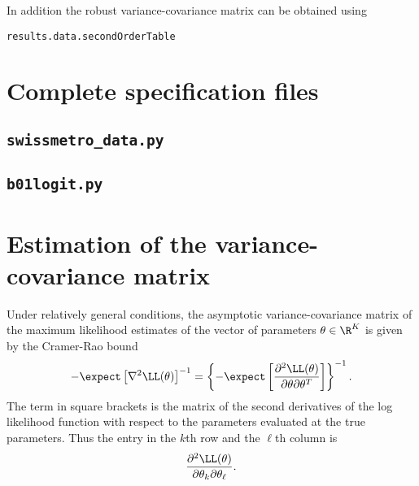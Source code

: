 \documentclass[12pt,a4paper]{article}
\newcommand*{\examplesPath}{../../examples}
\begin{document}
In addition the robust variance-covariance matrix can be obtained
using
\begin{lstlisting}[style=nonumbers]
results.data.secondOrderTable
\end{lstlisting}





\clearpage 


\appendix

\section{Complete specification files}

\subsection{\lstinline$swissmetro_data.py$}
\label{sec:data_spec}



\subsection{\lstinline$b01logit.py$}
\label{sec:modelPython}


\clearpage

   \section{Estimation of the  variance-covariance matrix}
   \label{sec:robust}
Under relatively general conditions,  the asymptotic
variance-covariance matrix of the maximum likelihood
estimates of the vector of parameters $\theta \in \R^K$ is given by the Cramer-Rao bound
\begin{equation}
  \label{eq:RaoCramer}
  -\expect\left[ \nabla^2 \LL(\theta)\right]^{-1} =  \left\{-\expect\left[\frac{\partial^2 \LL(\theta)}{\partial \theta \partial \theta^T}\right]\right\}^{-1}.
\end{equation}
The term in square brackets is the matrix of the second derivatives
of the log likelihood function with respect to the parameters
evaluated at the true parameters.  Thus the entry in the $k$\/th row and
the $\ell$\/th column is
\begin{equation}
  \label{eq:BAL4.34}
 \frac{\partial^2 \LL(\theta)}{\partial \theta_k \partial \theta_{\ell}}.
\end{equation}
\end{document}
